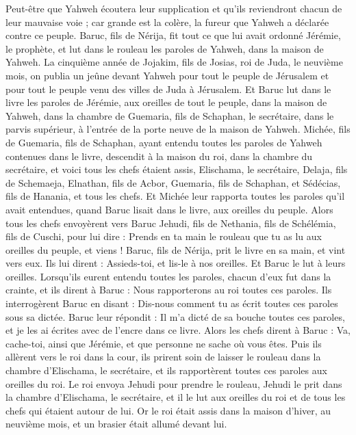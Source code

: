 \begin{multicols}{2}
Peut-être que Yahweh écoutera leur supplication et qu’ils reviendront chacun de leur mauvaise voie ; car grande est la colère, la fureur que Yahweh a déclarée contre ce peuple.
Baruc, fils de Nérija, fit tout ce que lui avait ordonné Jérémie, le prophète, et lut dans le rouleau les paroles de Yahweh, dans la maison de Yahweh.
La cinquième année de Jojakim, fils de Josias, roi de Juda, le neuvième mois, on publia un jeûne devant Yahweh pour tout le peuple de Jérusalem et pour tout le peuple venu des villes de Juda à Jérusalem.
Et Baruc lut dans le livre les paroles de Jérémie, aux oreilles de tout le peuple, dans la maison de Yahweh, dans la chambre de Guemaria, fils de Schaphan, le secrétaire, dans le parvis supérieur, à l'entrée de la porte neuve de la maison de Yahweh.
Michée, fils de Guemaria, fils de Schaphan, ayant entendu toutes les paroles de Yahweh contenues dans le livre,
descendit à la maison du roi, dans la chambre du secrétaire, et voici tous les chefs étaient assis, Elischama, le secrétaire, Delaja, fils de Schemaeja, Elnathan, fils de Acbor, Guemaria, fils de Schaphan, et Sédécias, fils de Hanania, et tous les chefs.
Et Michée leur rapporta toutes les paroles qu'il avait entendues, quand Baruc lisait dans le livre, aux oreilles du peuple.
Alors tous les chefs envoyèrent vers Baruc Jehudi, fils de Nethania, fils de Schélémia, fils de Cuschi, pour lui dire : Prends en ta main le rouleau que tu as lu aux oreilles du peuple, et viens ! Baruc, fils de Nérija, prit le livre en sa main, et vint vers eux.
Ils lui dirent : Assieds-toi, et lis-le à nos oreilles. Et Baruc le lut à leurs oreilles.
Lorsqu’ils eurent entendu toutes les paroles, chacun d’eux fut dans la crainte, et ils dirent à Baruc : Nous rapporterons au roi toutes ces paroles.
Ils interrogèrent Baruc en disant : Dis-nous comment tu as écrit toutes ces paroles sous sa dictée.
Baruc leur répondit : Il m’a dicté de sa bouche toutes ces paroles, et je les ai écrites avec de l'encre dans ce livre.
Alors les chefs dirent à Baruc : Va, cache-toi, ainsi que Jérémie, et que personne ne sache où vous êtes.
Puis ils allèrent vers le roi dans la cour, ils prirent soin de laisser le rouleau dans la chambre d'Elischama, le secrétaire, et ils rapportèrent toutes ces paroles aux oreilles du roi.
Le roi envoya Jehudi pour prendre le rouleau, Jehudi le prit dans la chambre d'Elischama, le secrétaire, et il le lut aux oreilles du roi et de tous les chefs qui étaient autour de lui.
Or le roi était assis dans la maison d'hiver, au neuvième mois, et un brasier était allumé devant lui.

\end{multicols}

